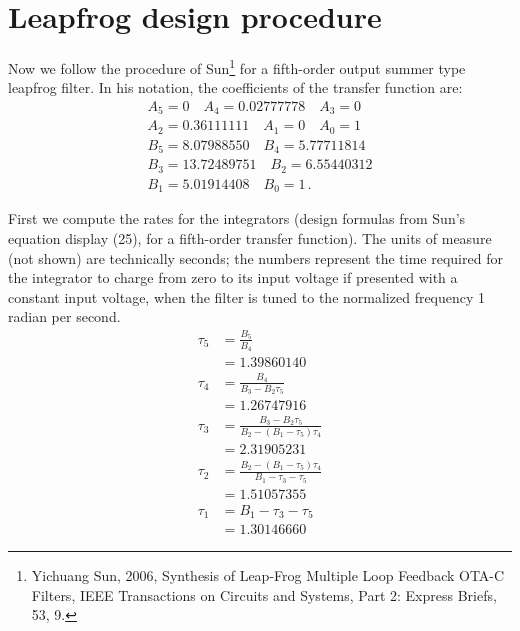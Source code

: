 \section{Leapfrog design procedure}

Now we follow the procedure of Sun\footnote{Yichuang Sun, 2006, Synthesis
of Leap-Frog Multiple Loop Feedback OTA-C Filters, IEEE Transactions on
Circuits and Systems, Part 2: Express Briefs, 53, 9.} for a fifth-order
output summer type leapfrog filter.  In his notation, the coefficients of
the transfer function are:
\begin{gather*}
  A_5=0 \quad A_4=0.02777778 \quad A_3=0 \\
  A_2=0.36111111 \quad A_1=0 \quad A_0=1 \\
  B_5=8.07988550 \quad B_4=5.77711814 \\
  B_3=13.72489751 \quad B_2=6.55440312 \\
  B_1=5.01914408 \quad B_0=1 \, .
\end{gather*}

First we compute the rates for the integrators (design formulas from
Sun's equation display (25), for a fifth-order transfer function).  The
units of measure (not shown) are technically seconds; the numbers
represent the time required for the integrator to charge
from zero to its input voltage if presented with a constant input voltage,
when the filter is tuned to the normalized frequency 1 radian per second.
\begin{align*}
  \tau_5 &=\frac{B_5}{B_4} \\
    &= 1.39860140 \\
  \tau_4 &= \frac{B_4}{B_3-B_2\tau_5} \\
    &= 1.26747916 \\
  \tau_3 &= \frac{B_3-B_2\tau_5}{B_2-(B_1-\tau_5)\tau_4} \\
    &= 2.31905231 \\
  \tau_2 &= \frac{B_2-(B_1-\tau_5)\tau_4}{B_1-\tau_3-\tau_5} \\
    &= 1.51057355 \\
  \tau_1 &= B_1-\tau_3-\tau_5 \\
    &= 1.30146660
\end{align*}

